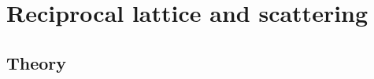 \documentclass[main.tex]{subfiles}
\begin{document}
	\section{Reciprocal lattice and scattering}
	\subsection{Theory}
\end{document}
